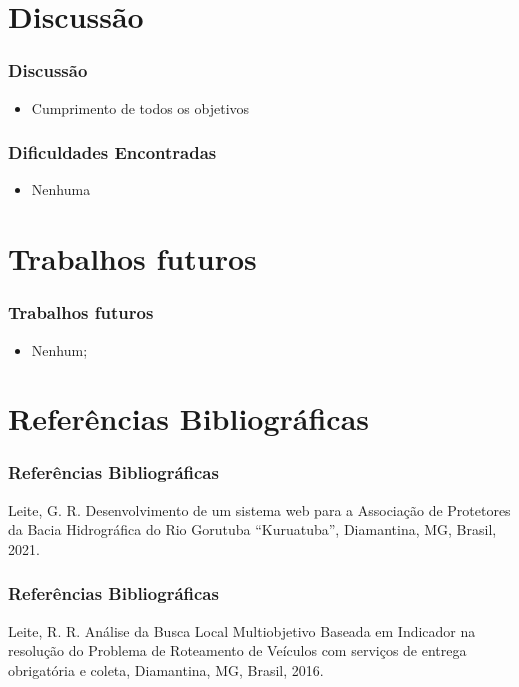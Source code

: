 \documentclass[xcolor=table]{beamer}
\begin{document}
\section{Discussão}
\begin{frame}
    \frametitle{Discussão}
    \begin{itemize}
        \item Cumprimento de todos os objetivos
        
    \end{itemize}
\end{frame}


\begin{frame}
    \frametitle{Dificuldades Encontradas}
    \begin{itemize}
     \item Nenhuma
    \end{itemize}

\end{frame}



\section{Trabalhos futuros}
\begin{frame}
    \frametitle{Trabalhos futuros}
    \begin{itemize}
        \item Nenhum;

        \end{itemize}

    
\end{frame}

    

\section{Referências Bibliográficas}

\begin{frame}
    \frametitle{Referências Bibliográficas}
    \scriptsize{
        Leite, G. R. Desenvolvimento de um sistema web para a Associação de Protetores da Bacia Hidrográfica do Rio Gorutuba ``Kuruatuba'', Diamantina, MG, Brasil, 2021. \newline
        
}
\end{frame}

\begin{frame}
    \frametitle{Referências Bibliográficas}
    \scriptsize{

        Leite, R. R. Análise da Busca Local Multiobjetivo Baseada em Indicador na resolução do Problema de Roteamento de Veículos com serviços de entrega obrigatória e coleta, Diamantina, MG, Brasil, 2016. \newline
    }
\end{frame}
\end{document}
